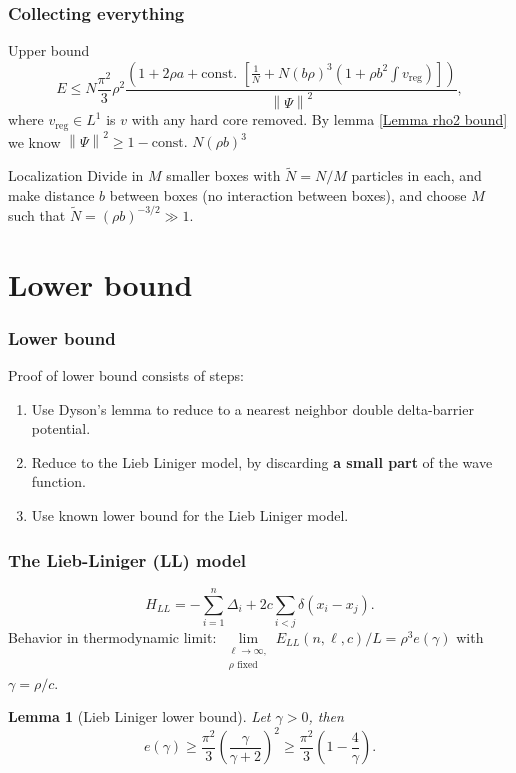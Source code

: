 \documentclass{beamer}[10]
\newcommand{\norm}[1]{\left\lVert #1 \right\rVert}
\newtheorem{mlemma}{Lemma}
\begin{document}
\begin{frame}
	\frametitle{Collecting everything}
	\begin{block}{Upper bound}
	\begin{equation}
	E\leq N\frac{\pi^2}{3}\rho^2\frac{\left(1+2\rho a +\text{const. } \left[\frac{1}{N}+ N (b\rho)^3\left(1+\rho b^2\int v_{\text{reg}}\right)\right]\right)}{\norm{\Psi}^2},
	\end{equation}	
	where $ v_{\text{reg}}\in L^{1} $ is $ v $ with any hard core removed.
		By lemma \ref{Lemma rho2 bound} we know $ \norm{\Psi}^2\geq 1-\text{const. }N(\rho b)^3 $
	\end{block}	
	\begin{block}{Localization}
		Divide in $ M $ smaller boxes with $ \tilde{N}=N/M $ particles in each, and make distance $ b $ between boxes (no interaction between boxes), and choose $ M $ such that $ \tilde{N}=(\rho b)^{-3/2}\gg 1 $.
	\end{block}

\end{frame}



\section{Lower bound}

\begin{frame}
	\frametitle{Lower bound}
	Proof of lower bound consists of steps:
	\begin{enumerate}
		\item Use Dyson's lemma to reduce to a nearest neighbor double delta-barrier potential.
		\item Reduce to the Lieb Liniger model, by discarding \textbf{a small part} of the wave function.
		\item Use known lower bound for the Lieb Liniger model.
	\end{enumerate}	
\end{frame}

\begin{frame}
	\frametitle{The Lieb-Liniger (LL) model}
	\begin{block}{}
	\begin{equation}
	H_{LL}=-\sum_{i=1}^{n}\Delta_i+2c\sum_{i<j}\delta(x_i-x_j).
	\end{equation}
	Behavior in thermodynamic limit: $ \lim\limits_{\substack{\ell\to\infty,\\ \rho\text{ fixed}}}E_{LL}(n,\ell,c)/L=\rho^3 e(\gamma) $ with $ \gamma=\rho/c $.
		\begin{mlemma}[Lieb Liniger lower bound] \label{LemmaLL-LowerBound}
			Let $ \gamma>0 $, then
			\begin{equation}
			e(\gamma)\geq \frac{\pi^2}{3}\left(\frac{\gamma}{\gamma+2}\right)^2\geq \frac{\pi^2}{3}\left(1-\frac{4}{\gamma}\right).
			\end{equation}
		\end{mlemma}
	\end{block}	
\end{frame}
\end{document}
